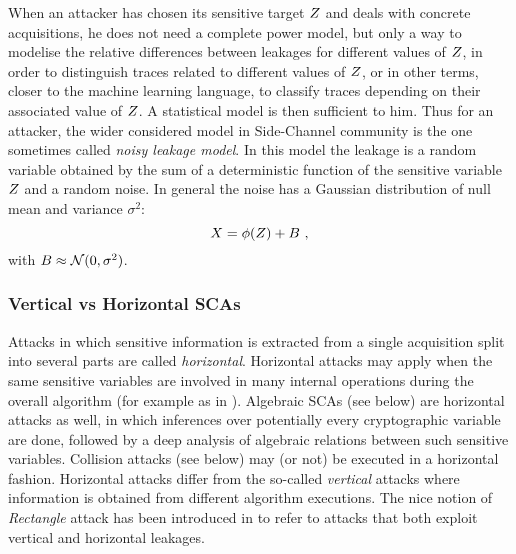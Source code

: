 When an attacker has chosen its sensitive target $Z$ and deals with concrete acquisitions, he does not need a complete power model, but only  a way to modelise the relative differences between leakages for different values of $Z$, in order to distinguish traces related to different values of $Z$, or in other terms, closer to the machine learning language, to classify traces depending on their associated value of $Z$. A statistical model is then sufficient to him. Thus for an attacker, the wider considered model in Side-Channel community is the one sometimes called \emph{noisy leakage model}. In this model the leakage is a random variable obtained by the sum of a deterministic function of the sensitive variable $Z$ and a random noise. In general the noise has a Gaussian distribution of null mean and variance $\sigma^2$:
\begin{equation}
X = \phi(Z) + B \mbox{ ,}
\end{equation}
with $B \approx \mathcal{N}(0,\sigma^2)$.


\subsubsection{Vertical vs Horizontal SCAs}
Attacks in which sensitive information
is extracted from a single acquisition split into several parts are called \emph{horizontal}. Horizontal attacks may apply when the same sensitive variables are involved in many internal operations during the overall algorithm (for example as in \cite{battistello2016horizontal}). Algebraic SCAs (see below) are horizontal attacks as well, in which inferences over potentially every cryptographic variable are done, followed by a deep analysis of algebraic relations between such sensitive variables. Collision attacks (see below) may (or not) be executed in a horizontal fashion. Horizontal attacks differ from the so-called \emph{vertical} attacks where information is obtained from different algorithm executions. The nice notion of \emph{Rectangle} attack has been introduced in \cite{bauer2013horizontal} to refer to attacks that both exploit vertical and horizontal leakages.

